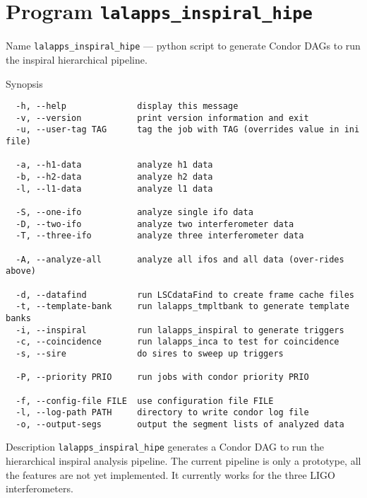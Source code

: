 \section{Program \texttt{lalapps\_inspiral\_hipe}}
\label{program:inspiral-hipe}

\begin{entry}
\item[Name]
\verb$lalapps_inspiral_hipe$ --- python script to generate Condor DAGs to
run the inspiral hierarchical pipeline.

\item[Synopsis]
\begin{verbatim}
  -h, --help              display this message
  -v, --version           print version information and exit
  -u, --user-tag TAG      tag the job with TAG (overrides value in ini file)
  
  -a, --h1-data           analyze h1 data
  -b, --h2-data           analyze h2 data
  -l, --l1-data           analyze l1 data
 
  -S, --one-ifo           analyze single ifo data
  -D, --two-ifo           analyze two interferometer data
  -T, --three-ifo         analyze three interferometer data
   
  -A, --analyze-all       analyze all ifos and all data (over-rides above)
 
  -d, --datafind          run LSCdataFind to create frame cache files
  -t, --template-bank     run lalapps_tmpltbank to generate template banks
  -i, --inspiral          run lalapps_inspiral to generate triggers
  -c, --coincidence       run lalapps_inca to test for coincidence
  -s, --sire              do sires to sweep up triggers
   
  -P, --priority PRIO     run jobs with condor priority PRIO
 
  -f, --config-file FILE  use configuration file FILE
  -l, --log-path PATH     directory to write condor log file
  -o, --output-segs       output the segment lists of analyzed data
\end{verbatim}

\item[Description] \verb$lalapps_inspiral_hipe$ generates a Condor DAG to run
the hierarchical inspiral analysis pipeline.  The current pipeline is only a
prototype, all the features are not yet implemented.  It currently works for
the three LIGO interferometers.  


\end{entry}
